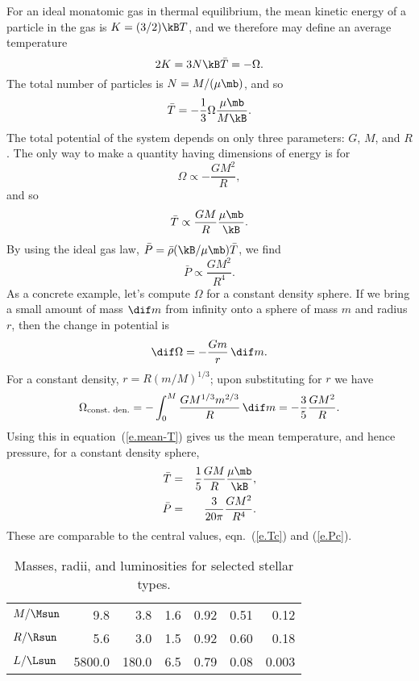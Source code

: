 For an ideal monatomic gas in thermal equilibrium, the mean kinetic energy of a particle in the gas is $K = (3/2)\kB T$, and we therefore may define an average temperature
\begin{equation}\label{e.Tbar}
	2 K = 3 N\kB \bar{T} = -\Omega.
\end{equation}
The total number of particles is $N=M/(\mu\mb)$, and so
\begin{equation}\label{e.mean-T}
\bar{T} = -\frac{1}{3}\Omega\frac{\mu\mb}{M\kB}.
\end{equation}
The total potential of the system depends on only three parameters: $G$, $M$, and $R$.  The only way to make a quantity having dimensions of energy is for
\[ \Omega \propto -\frac{GM^{2}}{R}, \]
and so
\[ \bar{T} \propto \frac{GM}{R}\frac{\mu\mb}{\kB}.  \]
By using the ideal gas law, $\bar{P} = \bar{\rho}(\kB/\mu\mb)\bar{T}$, we find
\[ \bar{P} \propto \frac{GM^{2}}{R^{4}}. \]
As a concrete example, let's compute $\Omega$ for a constant density sphere.
If we bring a small amount of mass $\dif m$ from infinity onto a sphere of mass $m$ and radius $r$, then the change in potential is \[ \dif\Omega = -\frac{Gm}{r}\,\dif m. \]
For a constant density, $r = R(m/M)^{1/3}$; upon substituting for $r$ we have
\[
	\Omega_{\textrm{const.\ den.}} = - \int_{0}^{M}\frac{GM^{1/3} m^{2/3}}{R}\,\dif m = -\frac{3}{5}\frac{GM^{2}}{R}.
\]
Using this in equation~(\ref{e.mean-T}) gives us the mean temperature, and hence pressure, for a constant density sphere,
\begin{eqnarray}\label{e.mean-T-rho}
\bar{T} &=& \frac{1}{5}\frac{GM}{R}\frac{\mu\mb}{\kB},\\
\label{e.mean-P}
\bar{P} &=& \frac{3}{20\pi}\frac{GM^{2}}{R^{4}}.
\end{eqnarray}
These are comparable to the central values, eqn.~(\ref{e.Tc}) and (\ref{e.Pc}).

\begin{table}
\caption{\label{t.stellar-properties} Masses, radii, and luminosities for selected stellar types.}
\begin{tabular}{ld{4.2}d{3.2}d{1.2}d{1.2}d{1.2}d{2.3}}
 &  &  &  &  &  & \\ 
\hline
$M/\Msun$ & 9.8 & 3.8 & 1.6 & 0.92 & 0.51 & 0.12\\
$R/\Rsun$ & 5.6 & 3.0 & 1.5 & 0.92 & 0.60 & 0.18\\
$L/\Lsun$ & 5800.0    & 180.0 & 6.5 & 0.79 & 0.08 & 0.003\\
\end{tabular}
\end{table}

